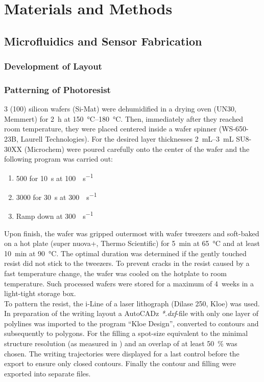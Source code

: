 \chapter{Materials and Methods}

\section{Microfluidics and Sensor Fabrication}

\subsection{Development of Layout}

\subsection{Patterning of Photoresist}
\SI{3}{\inch} (100) silicon wafers (Si-Mat) were dehumidified in a drying oven (UN30, Memmert) for \SI{2}{\hour} at \SIrange{150}{180}{\degreeCelsius}. Then, immediately after they reached room temperature, they were placed centered inside a wafer spinner (WS-650-23B, Laurell Technologies). For the desired layer thicknesses \SIrange{2}{3}{\milli\liter} SU8-30XX (Microchem) were poured carefully onto the center of the wafer and the following program was carried out:
\begin{enumerate}[noitemsep]
\item \SI{500}{\rpm} for \SI{10}{s} at \SI{100}{\rpm\per\second}
\item \SI{3000}{\rpm} for \SI{30}{s} at \SI{300}{\rpm\per\second}
\item Ramp down at \SI{300}{\rpm\per\second}
\end{enumerate}
Upon finish, the wafer was gripped outermost with wafer tweezers and soft-baked on a hot plate (super nuova+, Thermo Scientific) for \SI{5}{\minute} at \SI{65}{\degreeCelsius} and at least \SI{10}{\minute} at \SI{90}{\degreeCelsius}. The optimal duration was determined if the gently touched resist did not stick to the tweezers. To prevent cracks in the resist caused by a fast temperature change, the wafer was cooled on the hotplate to room	temperature. Such processed wafers were stored for a maximum of \SI{4}{weeks} in a light-tight storage box.\\
To pattern the resist, the i-Line of a laser lithograph (Dilase 250, Kloe) was used. In preparation of the writing layout a AutoCADz \textit{*.dxf}-file with only one layer of polylines was imported to the program ``Kloe Design'', converted to contours and subsequently to polygons. For the filling a spot-size equivalent to the minimal structure resolution (as measured in \citet{lit:tech:rojda2020}) and an overlap of at least \SI{50}{\percent} was chosen. The writing trajectories were displayed for a last control before the export to ensure only closed contours. Finally the contour and filling were exported into separate files.\\
